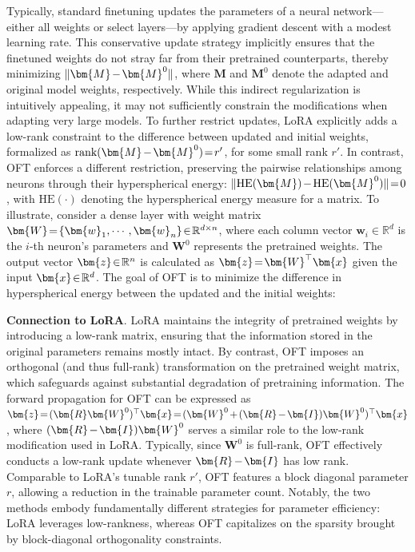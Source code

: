 \begin{itemize}[leftmargin=*,nosep]
Typically, standard finetuning updates the parameters of a neural network—either all weights or select layers—by applying gradient descent with a modest learning rate. This conservative update strategy implicitly ensures that the finetuned weights do not stray far from their pretrained counterparts, thereby minimizing $\thickmuskip=2mu \medmuskip=2mu \| \bm{M} - \bm{M}^0\|$, where $\bm{M}$ and $\bm{M}^0$ denote the adapted and original model weights, respectively. While this indirect regularization is intuitively appealing, it may not sufficiently constrain the modifications when adapting very large models. To further restrict updates, LoRA explicitly adds a low-rank constraint to the difference between updated and initial weights, formalized as $\thickmuskip=2mu \medmuskip=2mu \text{rank}(\bm{M} - \bm{M}^0)=r'$, for some small rank $r'$. In contrast, OFT enforces a different restriction, preserving the pairwise relationships among neurons through their hyperspherical energy: $\thickmuskip=2mu \medmuskip=2mu \| \text{HE}(\bm{M})-\text{HE}(\bm{M}^0) \|=0$, with $\text{HE}(\cdot)$ denoting the hyperspherical energy measure for a matrix. To illustrate, consider a dense layer with weight matrix $\thickmuskip=2mu \medmuskip=2mu \bm{W}=\{\bm{w}_1,\cdots,\bm{w}_n\}\in\mathbb{R}^{d\times n}$, where each column vector $\bm{w}_i\in\mathbb{R}^{d}$ is the $i$-th neuron's parameters and $\bm{W}^0$ represents the pretrained weights. The output vector $\thickmuskip=2mu \medmuskip=2mu \bm{z}\in\mathbb{R}^n$ is calculated as $\thickmuskip=2mu \medmuskip=2mu \bm{z}=\bm{W}^\top\bm{x}$ given the input $\thickmuskip=2mu \medmuskip=2mu \bm{x}\in\mathbb{R}^d$. The goal of OFT is to minimize the difference in hyperspherical energy between the updated and the initial weights:

\textbf{Connection to LoRA}. LoRA maintains the integrity of pretrained weights by introducing a low-rank matrix, ensuring that the information stored in the original parameters remains mostly intact. By contrast, OFT imposes an orthogonal (and thus full-rank) transformation on the pretrained weight matrix, which safeguards against substantial degradation of pretraining information. The forward propagation for OFT can be expressed as $\thickmuskip=2mu \medmuskip=2mu \bm{z}=(\bm{R}\bm{W}^0)^\top\bm{x}=(\bm{W}^0+(\bm{R}-\bm{I})\bm{W}^0)^\top\bm{x}$, where $\thickmuskip=2mu \medmuskip=2mu (\bm{R}-\bm{I})\bm{W}^0$ serves a similar role to the low-rank modification used in LoRA. Typically, since $\bm{W}^0$ is full-rank, OFT effectively conducts a low-rank update whenever $\thickmuskip=2mu \medmuskip=2mu \bm{R}-\bm{I}$ has low rank. Comparable to LoRA’s tunable rank $r'$, OFT features a block diagonal parameter $r$, allowing a reduction in the trainable parameter count. Notably, the two methods embody fundamentally different strategies for parameter efficiency: LoRA leverages low-rankness, whereas OFT capitalizes on the sparsity brought by block-diagonal orthogonality constraints.


\end{itemize}
